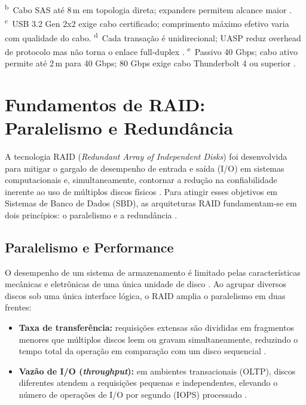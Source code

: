\documentclass[titlepage]{article}
\begin{document}
\begin{table}[htbp]
\textsuperscript{b}~Cabo SAS até 8\,m em topologia direta; expanders permitem alcance maior \cite{seagate_sas,sas4_standard}.\quad
\textsuperscript{c}~USB 3.2 Gen 2x2 exige cabo certificado; comprimento máximo efetivo varia com qualidade do cabo.\quad
\textsuperscript{d}~Cada transação é unidirecional; UASP reduz overhead de protocolo mas não torna o enlace full-duplex \cite{usb_uas}.\quad
\textsuperscript{e}~Passivo 40 Gbps; cabo ativo permite até 2\,m para 40 Gbps; 80 Gbps exige cabo Thunderbolt 4 ou superior \cite{usb4_spec}.
\caption{Comparação de interfaces DAS por taxa, distância, hot-plug, modo de operação e protocolo. Taxas são limites de enlace, não benchmarks; demais valores típicos de produto ou padrão, não garantidos universalmente.}
\label{tab:interfaces_das}
\end{table}

\section{Fundamentos de RAID: Paralelismo e Redundância}
\label{sec:paralelismo_redundancia}
A tecnologia RAID (\textit{Redundant Array of Independent Disks}) foi desenvolvida para mitigar o gargalo de desempenho de entrada e saída (I/O) em sistemas computacionais e, simultaneamente, contornar a redução na confiabilidade inerente ao uso de múltiplos discos físicos \cite{silberschatz2020}. Para atingir esses objetivos em Sistemas de Banco de Dados (SBD), as arquiteturas RAID fundamentam-se em dois princípios: o paralelismo e a redundância \cite{silberschatz2020}.

\subsection{Paralelismo e Performance}
O desempenho de um sistema de armazenamento é limitado pelas características mecânicas e eletrônicas de uma única unidade de disco \cite{silberschatz2020}. Ao agrupar diversos discos sob uma única interface lógica, o RAID amplia o paralelismo em duas frentes:
\begin{itemize}
    \item \textbf{Taxa de transferência:} requisições extensas são divididas em fragmentos menores que múltiplos discos leem ou gravam simultaneamente, reduzindo o tempo total da operação em comparação com um disco sequencial \cite{silberschatz2020}.
    \item \textbf{Vazão de I/O (\textit{throughput}):} em ambientes transacionais (OLTP), discos diferentes atendem a requisições pequenas e independentes, elevando o número de operações de I/O por segundo (IOPS) processado \cite{silberschatz2020}.
\end{itemize}
\end{document}
